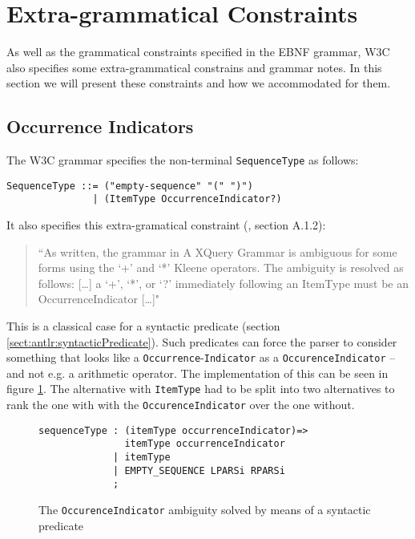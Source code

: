 \section{Extra-grammatical Constraints}
\label{sect:implementation:extraGrammatical}
As well as the grammatical constraints specified in the EBNF grammar, W3C also specifies some extra-grammatical constrains and grammar notes\cite{w3c00}. In this section we will present these constraints and how we accommodated for them. 

\subsection{Occurrence Indicators}
\label{sect:implementation:occurence}

The W3C grammar specifies the non-terminal \verb!SequenceType! as follows:
\begin{Verbatim}
SequenceType ::= ("empty-sequence" "(" ")")
               | (ItemType OccurrenceIndicator?)
\end{Verbatim}
It also specifies this extra-gramatical constraint (\cite{w3c00}, section A.1.2):
\begin{quote}
``As written, the grammar in A XQuery Grammar is ambiguous for some forms using the `+' and `*' Kleene operators. The ambiguity is resolved as follows: [\ldots] a `+', `*', or `?' immediately following an ItemType must be an OccurrenceIndicator [\ldots]"
\end{quote}

This is a classical case for a syntactic predicate (section
\ref{sect:antlr:syntacticPredicate}). Such predicates can force the parser to
consider something that looks like a \verb!Occurrence!-\verb!Indicator! as a
\verb!OccurenceIndicator! -- and not e.g. a arithmetic operator. The
implementation of this can be seen in figure \ref{fig:occurrenceIndicator}. The
alternative with \verb!ItemType! had to be split into two alternatives to rank
the one with with the \verb!Occurence!\verb!Indicator! over the one without.

\begin{figure}[h!]
\begin{Verbatim}
sequenceType : (itemType occurrenceIndicator)=> 
               itemType occurrenceIndicator
             | itemType
             | EMPTY_SEQUENCE LPARSi RPARSi
             ;
\end{Verbatim}
\caption[The \texttt{OccurenceIndicator} ambiguity solved]{The \texttt{OccurenceIndicator} ambiguity solved by means of a syntactic predicate}
\label{fig:occurrenceIndicator}
\end{figure}

